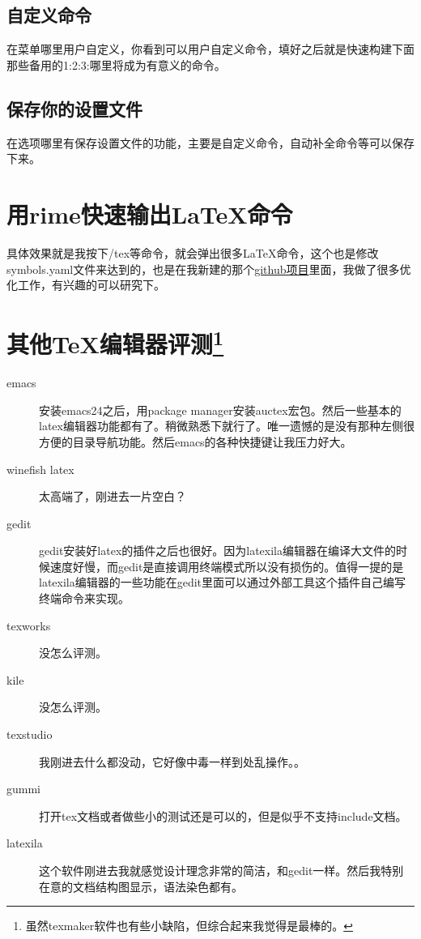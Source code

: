 \subsection{自定义命令}
在菜单哪里用户自定义，你看到可以用户自定义命令，填好之后就是快速构建下面那些备用的1:2:3:哪里将成为有意义的命令。

\subsection{保存你的设置文件}
在选项哪里有保存设置文件的功能，主要是自定义命令，自动补全命令等可以保存下来。

\section{用rime快速输出\LaTeX 命令}
具体效果就是我按下/tex等命令，就会弹出很多\LaTeX 命令，这个也是修改symbols.yaml文件来达到的，也是在我新建的那个\href{https://github.com/a358003542/rime-symbols-yaml}{github项目}里面，我做了很多优化工作，有兴趣的可以研究下。


\section[其他\TeX 编辑器评测]{其他\TeX 编辑器评测\footnote{虽然texmaker软件也有些小缺陷，但综合起来我觉得是最棒的。}}
\begin{description}
\item[emacs] 安装emacs24之后，用package manager安装auctex宏包。然后一些基本的latex编辑器功能都有了。稍微熟悉下就行了。唯一遗憾的是没有那种左侧很方便的目录导航功能。然后emacs的各种快捷键让我压力好大。
\item[winefish latex] 太高端了，刚进去一片空白？
\item[gedit] gedit安装好latex的插件之后也很好。因为latexila编辑器在编译大文件的时候速度好慢，而gedit是直接调用终端模式所以没有损伤的。值得一提的是latexila编辑器的一些功能在gedit里面可以通过外部工具这个插件自己编写终端命令来实现。
\item[texworks] 没怎么评测。
\item[kile] 没怎么评测。
\item[texstudio] 我刚进去什么都没动，它好像中毒一样到处乱操作。。
\item[gummi] 打开tex文档或者做些小的测试还是可以的，但是似乎不支持include文档。
\item[latexila] 这个软件刚进去我就感觉设计理念非常的简洁，和gedit一样。然后我特别在意的文档结构图显示，语法染色都有。
\end{description}


